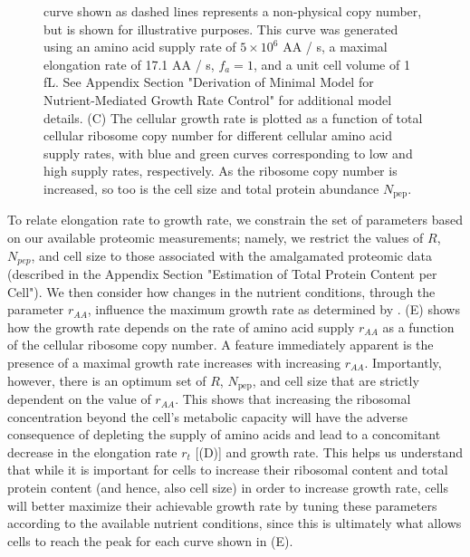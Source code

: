 \begin{figure}
{{        curve shown as dashed lines represents a non-physical copy number, but
        is shown for illustrative purposes. This curve was generated using an
        amino acid supply rate of $5 \times 10^6$ AA / s, a maximal elongation
        rate of 17.1 AA / s, $f_a = 1$, and a unit cell volume of 1 fL.
        See Appendix Section "Derivation of Minimal Model for Nutrient-Mediated
        Growth Rate Control" for additional model details. (C) The cellular
        growth rate is plotted as a function of total cellular ribosome copy
        number for different cellular amino acid supply rates, with blue and
        green curves corresponding to low and high supply rates, respectively.
        As the ribosome copy number is increased, so too is the cell size and
        total protein abundance $N_\text{pep}$.
    }
    \label{fig:elongation_rate_model}
    }
\end{figure}

To relate elongation rate to growth rate, we constrain the set of parameters
based on our available proteomic measurements; namely, we restrict the values of
$R$, $N_{pep}$, and cell size to those associated with the amalgamated proteomic
data (described in the Appendix Section "Estimation of Total Protein Content per
Cell"). We then consider how changes in the nutrient conditions, through the
parameter $r_{AA}$, influence the maximum growth rate as determined by
. (E) shows how the growth rate
depends on the rate of amino acid supply $r_{AA}$ as a function of the cellular
ribosome copy number. A feature immediately apparent is the presence of a
maximal growth rate increases with increasing $r_{AA}$. Importantly, however,
there is an optimum set of $R$, $N_\text{pep}$, and cell size that are strictly
dependent on the value of $r_{AA}$. This shows that increasing the ribosomal
concentration beyond the cell's metabolic capacity will have the adverse
consequence of depleting the supply of amino acids and lead to a concomitant
decrease in the elongation rate $r_t$ [(D)] and
growth rate. This helps us understand that while it is important for cells to
increase their ribosomal content and total protein content (and hence, also cell
size) in order to increase growth rate, cells will better maximize their
achievable growth rate by tuning these parameters according to the available
nutrient conditions, since this is ultimately what allows cells to reach the
peak for each curve shown in (E).

